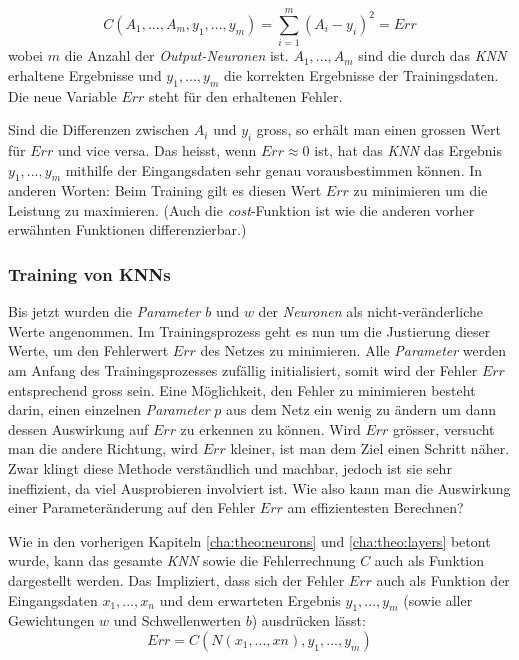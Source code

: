 \begin{equation}\label{eq:cost}
C(A_1,...,A_m,y_1,...,y_m)=\sum_{i=1}^{m}\left(A_i-y_i\right)^2=Err
\end{equation}
wobei $m$ die Anzahl der \textit{Output-Neuronen} ist. $A_1,...,A_m$ sind die durch das \textit{KNN} erhaltene Ergebnisse und $y_1,...,y_m$ die korrekten Ergebnisse der Trainingsdaten. Die neue Variable $Err$ steht für den erhaltenen Fehler.

Sind die Differenzen zwischen $A_i$ und $y_i$ gross, so erhält man einen grossen Wert für $Err$ und vice versa. Das heisst, wenn $Err \approx 0$ ist, hat das \textit{KNN} das Ergebnis $y_1,...,y_m$ mithilfe der Eingangsdaten sehr genau vorausbestimmen können. In anderen Worten: Beim Training gilt es diesen Wert $Err$ zu minimieren um die Leistung zu maximieren. (Auch die \textit{cost}-Funktion ist wie die anderen vorher erwähnten Funktionen differenzierbar.)

\subsubsection{Training von KNNs}\label{cha:theo:backprop}
Bis jetzt wurden die \textit{Parameter} $b$ und $w$ der \textit{Neuronen} als nicht-veränderliche Werte angenommen. Im Trainingsprozess geht es nun um die Justierung dieser Werte, um den Fehlerwert $Err$ des Netzes zu minimieren. Alle \textit{Parameter} werden am Anfang des Trainingsprozesses zufällig initialisiert, somit wird der Fehler $Err$ entsprechend gross sein. Eine Möglichkeit, den Fehler zu minimieren besteht darin, einen einzelnen \textit{Parameter} $p$ aus dem Netz ein wenig zu ändern um dann dessen Auswirkung auf $Err$ zu erkennen zu können. Wird $Err$ grösser, versucht man die andere Richtung, wird $Err$ kleiner, ist man dem Ziel einen Schritt näher. Zwar klingt diese Methode verständlich und machbar, jedoch ist sie sehr ineffizient, da viel Ausprobieren involviert ist. Wie also kann man die Auswirkung einer Parameteränderung auf den Fehler $Err$ am effizientesten Berechnen?

Wie in den vorherigen Kapiteln \ref{cha:theo:neurons} und \ref{cha:theo:layers} betont wurde, kann das gesamte \textit{KNN} sowie die Fehlerrechnung $C$ auch als Funktion dargestellt werden. Das Impliziert, dass sich der Fehler $Err$ auch als Funktion der Eingangsdaten $x_1,...,x_n$ und dem erwarteten Ergebnis $y_1,...,y_m$ (sowie aller Gewichtungen $w$ und Schwellenwerten $b$) ausdrücken lässt:
\begin{equation}\label{eq:err_func}
Err = C(N(x_1,...,xn), y_1,...,y_m)
\end{equation}

